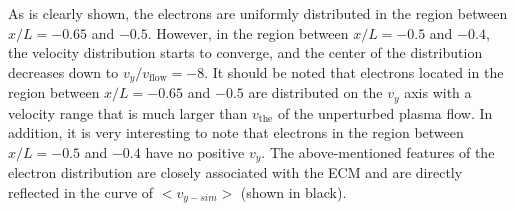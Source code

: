 \documentclass[draft,jgrga]{agutex2015}
\begin{document}
\begin{article}
As is clearly shown, the 
electrons are uniformly distributed 
in the region between $x/L =-0.65$ and $-0.5$.
However, in the region between $x/L =-0.5$ and $-0.4$, 
the velocity distribution starts to converge, 
and the center of the distribution decreases down to 
$v_y/v_{\mathrm{flow}}=-8$. 
It should be noted that 
electrons located in the region between $x/L =-0.65$ and $-0.5$
are distributed on the $v_y$ axis with a velocity range that is much larger 
than $v_{\mathrm{the}}$ of the unperturbed plasma flow. 
In addition, it is very interesting to note that electrons
in the region between $x/L =-0.5$ and $-0.4$ have no positive $v_y$.
The above-mentioned features of the electron distribution are closely
associated with the ECM 
and are directly reflected in the curve of $<v_{y-sim}>$ (shown in black).



\end{article}
\end{document}
